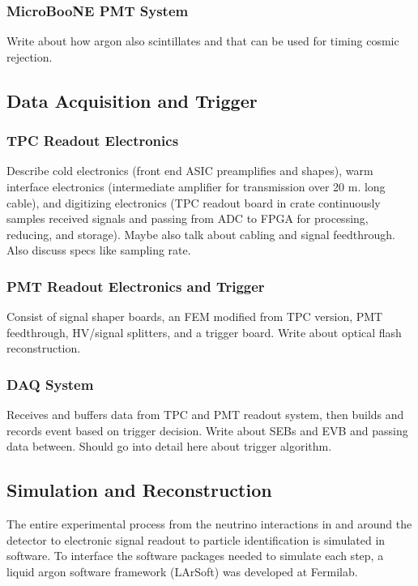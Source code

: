  \subsubsection{MicroBooNE PMT System}
    Write about how argon also scintillates and that can be used for timing
    cosmic rejection.

\subsection{Data Acquisition and Trigger}\label{daq}
  \subsubsection{TPC Readout Electronics}
    Describe cold electronics (front end ASIC preamplifies and shapes), warm
    interface electronics (intermediate amplifier for transmission over 20 m.
    long cable), and digitizing electronics (TPC readout board in crate
    continuously samples received signals and passing from ADC to FPGA for
    processing, reducing, and storage). Maybe also talk about cabling and
    signal feedthrough. Also discuss specs like sampling rate.
  \subsubsection{PMT Readout Electronics and Trigger}
    Consist of signal shaper boards, an FEM modified from TPC version, PMT
    feedthrough, HV/signal splitters, and a trigger board. Write about optical
    flash reconstruction.
  \subsubsection{DAQ System}
    Receives and buffers data from TPC and PMT readout system, then builds and
    records event based on trigger decision. Write about SEBs and EVB and
    passing data between. Should go into detail here about trigger algorithm.

\subsection{Simulation and Reconstruction}\label{reco}
  The entire experimental process from the neutrino interactions in and around
  the detector to electronic signal readout to particle identification is
  simulated in software. To interface the software packages needed to simulate
  each step, a liquid argon software framework (LArSoft) was developed at
  Fermilab.
